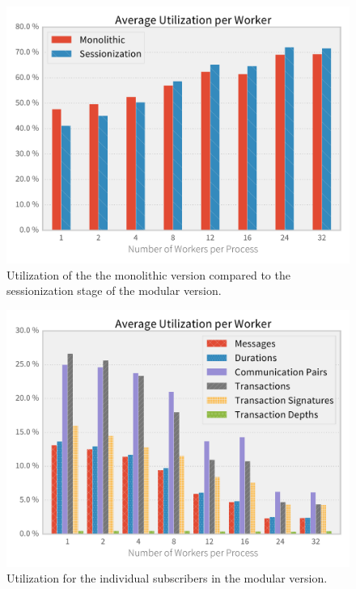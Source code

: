 \begin{figure}[p]
  \centering
    \includegraphics[width=1\textwidth]{figures/evaluation/sessutil}
    \caption[Utilization of sessionization workers]{Utilization of the the monolithic
    version compared to the sessionization stage of the modular version.}
    \label{fig:sessutil}
\end{figure}
\begin{figure}[p]
  \centering
    \includegraphics[width=1\textwidth]{figures/evaluation/subsutil}
    \caption[Utilization of subscribing workers]{Utilization for the individual
    subscribers in the modular version.}
    \label{fig:subutil}
\end{figure}

